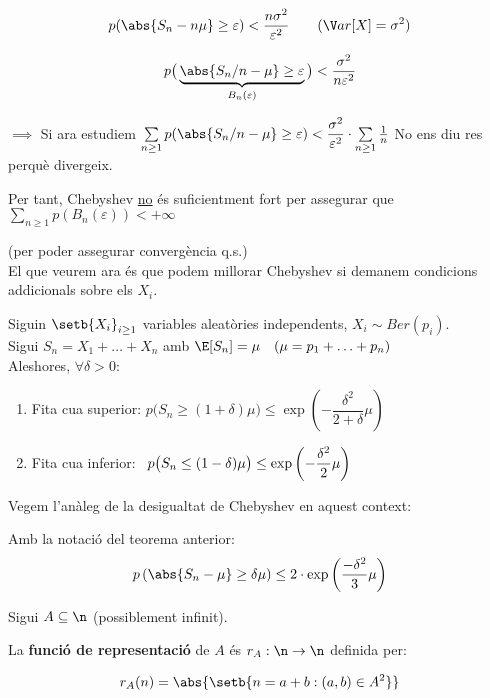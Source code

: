 \[
  p(\abs{S_n - n\mu} \geq \varepsilon) < \frac{n\sigma^2}{\varepsilon^2} \qquad (\V ar[X] = \sigma^2)
\]

\[
  p\big(\underbrace{\abs{S_n/n - \mu} \geq \varepsilon}_{B_n(\varepsilon)}\big) < \frac{\sigma^2}{n\varepsilon^2}
\]

$\implies$ Si ara estudiem $\sum\limits_{n\geq1}p(\abs{S_n/n - \mu} \geq \varepsilon) < \dfrac{\sigma^2}{\varepsilon^2}\cdot \sum\limits_{n\geq1} \frac{1}{n}$ No ens diu res perquè divergeix.

\newpage

Per tant, Chebyshev \underline{no} és suficientment fort per assegurar que $\sum\limits_{n\geq1}p(B_n(\varepsilon)) < +\infty$

(per poder assegurar convergència q.s.) \\

El que veurem ara és que podem millorar Chebyshev si demanem condicions addicionals sobre els $X_i$.

\begin{thm}
  Siguin $\setb{X_i}_{i\geq1}$ variables aleatòries independents, $X_i \sim Ber(p_i)$. \\
  
  Sigui $S_n = X_1 + \ldots + X_n$ amb $\E[S_n] = \mu \quad (\mu = p_1 + \ldots + p_n)$ \\
  
  Aleshores, $\forall \delta>0$:
  \begin{enumerate}
      \item Fita cua superior: $p\big(S_n \geq (1+\delta)\mu\big) \leq \exp\left(-\dfrac{\delta^2}{2+\delta}\mu\right)$
      \item Fita cua inferior: $\hspace{0.18cm}p\big(S_n\leq(1-\delta)\mu \big) \leq \exp\left(-\dfrac{\delta^2}{2}\mu\right)$
  \end{enumerate}
\end{thm}

Vegem l'anàleg de la desigualtat de Chebyshev en aquest context:

\begin{col}
  Amb la notació del teorema anterior:
  \[
    p\left(\abs{S_n - \mu}\geq\delta\mu\right) \leq 2\cdot \exp\left(\dfrac{-\delta^2}{3}\mu \right)
  \]
\end{col}

\begin{defi}
  Sigui $A\subseteq \n$ (possiblement infinit). 
  
  La \textbf{funció de representació} de $A$ és $r_A:\n \to \n$ definida per:
  
  \[
    r_A(n) = \abs{\setb{n=a+b : (a,b) \in A^2}}
  \]
\end{defi}

